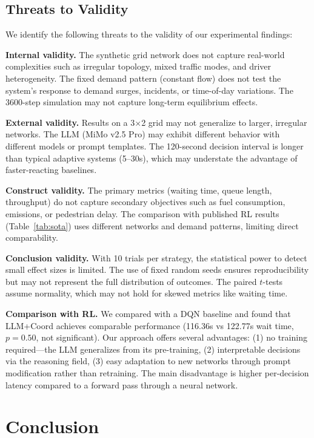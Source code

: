 \documentclass[conference]{IEEEtran}
\begin{document}
\subsection{Threats to Validity}
\label{sec:threats}
We identify the following threats to the validity of our experimental findings:

\textbf{Internal validity.} The synthetic grid network does not capture real-world complexities such as irregular topology, mixed traffic modes, and driver heterogeneity. The fixed demand pattern (constant flow) does not test the system's response to demand surges, incidents, or time-of-day variations. The 3600-step simulation may not capture long-term equilibrium effects.

\textbf{External validity.} Results on a 3$\times$2 grid may not generalize to larger, irregular networks. The LLM (MiMo v2.5 Pro) may exhibit different behavior with different models or prompt templates. The 120-second decision interval is longer than typical adaptive systems (5--30s), which may understate the advantage of faster-reacting baselines.

\textbf{Construct validity.} The primary metrics (waiting time, queue length, throughput) do not capture secondary objectives such as fuel consumption, emissions, or pedestrian delay. The comparison with published RL results (Table~\ref{tab:sota}) uses different networks and demand patterns, limiting direct comparability.

\textbf{Conclusion validity.} With 10 trials per strategy, the statistical power to detect small effect sizes is limited. The use of fixed random seeds ensures reproducibility but may not represent the full distribution of outcomes. The paired $t$-tests assume normality, which may not hold for skewed metrics like waiting time.

\textbf{Comparison with RL.} We compared with a DQN baseline and found that LLM+Coord achieves comparable performance (116.36s vs 122.77s wait time, $p=0.50$, not significant). Our approach offers several advantages: (1) no training required---the LLM generalizes from its pre-training, (2) interpretable decisions via the reasoning field, (3) easy adaptation to new networks through prompt modification rather than retraining. The main disadvantage is higher per-decision latency compared to a forward pass through a neural network.


\section{Conclusion}
\label{sec:conclusion}
\end{document}
